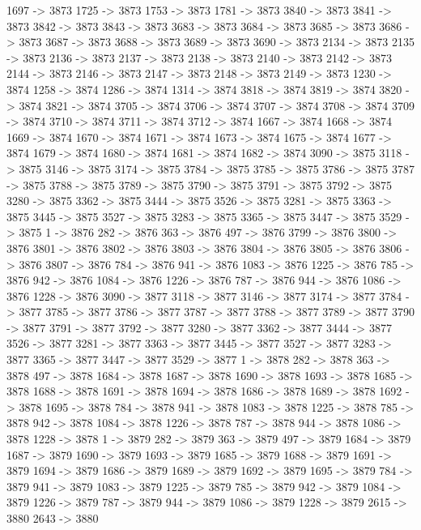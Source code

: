 {	1697 -> 3873
	1725 -> 3873
	1753 -> 3873
	1781 -> 3873
	3840 -> 3873
	3841 -> 3873
	3842 -> 3873
	3843 -> 3873
	3683 -> 3873
	3684 -> 3873
	3685 -> 3873
	3686 -> 3873
	3687 -> 3873
	3688 -> 3873
	3689 -> 3873
	3690 -> 3873
	2134 -> 3873
	2135 -> 3873
	2136 -> 3873
	2137 -> 3873
	2138 -> 3873
	2140 -> 3873
	2142 -> 3873
	2144 -> 3873
	2146 -> 3873
	2147 -> 3873
	2148 -> 3873
	2149 -> 3873
	1230 -> 3874
	1258 -> 3874
	1286 -> 3874
	1314 -> 3874
	3818 -> 3874
	3819 -> 3874
	3820 -> 3874
	3821 -> 3874
	3705 -> 3874
	3706 -> 3874
	3707 -> 3874
	3708 -> 3874
	3709 -> 3874
	3710 -> 3874
	3711 -> 3874
	3712 -> 3874
	1667 -> 3874
	1668 -> 3874
	1669 -> 3874
	1670 -> 3874
	1671 -> 3874
	1673 -> 3874
	1675 -> 3874
	1677 -> 3874
	1679 -> 3874
	1680 -> 3874
	1681 -> 3874
	1682 -> 3874
	3090 -> 3875
	3118 -> 3875
	3146 -> 3875
	3174 -> 3875
	3784 -> 3875
	3785 -> 3875
	3786 -> 3875
	3787 -> 3875
	3788 -> 3875
	3789 -> 3875
	3790 -> 3875
	3791 -> 3875
	3792 -> 3875
	3280 -> 3875
	3362 -> 3875
	3444 -> 3875
	3526 -> 3875
	3281 -> 3875
	3363 -> 3875
	3445 -> 3875
	3527 -> 3875
	3283 -> 3875
	3365 -> 3875
	3447 -> 3875
	3529 -> 3875
	1 -> 3876
	282 -> 3876
	363 -> 3876
	497 -> 3876
	3799 -> 3876
	3800 -> 3876
	3801 -> 3876
	3802 -> 3876
	3803 -> 3876
	3804 -> 3876
	3805 -> 3876
	3806 -> 3876
	3807 -> 3876
	784 -> 3876
	941 -> 3876
	1083 -> 3876
	1225 -> 3876
	785 -> 3876
	942 -> 3876
	1084 -> 3876
	1226 -> 3876
	787 -> 3876
	944 -> 3876
	1086 -> 3876
	1228 -> 3876
	3090 -> 3877
	3118 -> 3877
	3146 -> 3877
	3174 -> 3877
	3784 -> 3877
	3785 -> 3877
	3786 -> 3877
	3787 -> 3877
	3788 -> 3877
	3789 -> 3877
	3790 -> 3877
	3791 -> 3877
	3792 -> 3877
	3280 -> 3877
	3362 -> 3877
	3444 -> 3877
	3526 -> 3877
	3281 -> 3877
	3363 -> 3877
	3445 -> 3877
	3527 -> 3877
	3283 -> 3877
	3365 -> 3877
	3447 -> 3877
	3529 -> 3877
	1 -> 3878
	282 -> 3878
	363 -> 3878
	497 -> 3878
	1684 -> 3878
	1687 -> 3878
	1690 -> 3878
	1693 -> 3878
	1685 -> 3878
	1688 -> 3878
	1691 -> 3878
	1694 -> 3878
	1686 -> 3878
	1689 -> 3878
	1692 -> 3878
	1695 -> 3878
	784 -> 3878
	941 -> 3878
	1083 -> 3878
	1225 -> 3878
	785 -> 3878
	942 -> 3878
	1084 -> 3878
	1226 -> 3878
	787 -> 3878
	944 -> 3878
	1086 -> 3878
	1228 -> 3878
	1 -> 3879
	282 -> 3879
	363 -> 3879
	497 -> 3879
	1684 -> 3879
	1687 -> 3879
	1690 -> 3879
	1693 -> 3879
	1685 -> 3879
	1688 -> 3879
	1691 -> 3879
	1694 -> 3879
	1686 -> 3879
	1689 -> 3879
	1692 -> 3879
	1695 -> 3879
	784 -> 3879
	941 -> 3879
	1083 -> 3879
	1225 -> 3879
	785 -> 3879
	942 -> 3879
	1084 -> 3879
	1226 -> 3879
	787 -> 3879
	944 -> 3879
	1086 -> 3879
	1228 -> 3879
	2615 -> 3880
	2643 -> 3880
}
